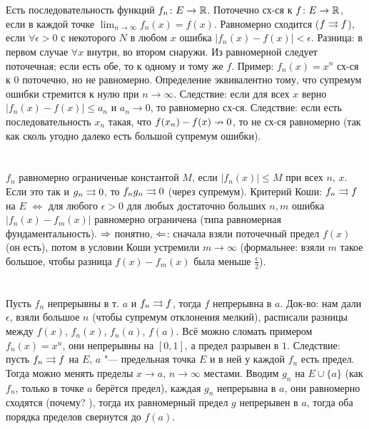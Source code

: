 \section{} %
Есть последовательность функций $f_n \colon E \to \mathbb{R}$.
Поточечно сх-ся к $f \colon E \to \mathbb{R}$, если в каждой точке $\lim_{n\to\infty} f_n(x) = f(x)$.
Равномерно сходится ($f \rightrightarrows f$), если $\forall \epsilon > 0$ с некоторого $N$
в любом $x$ ошибка $|f_n(x)-f(x)|<\epsilon$.
Разница: в первом случае $\forall x$ внутри, во втором снаружи.
Из равномерной следует поточечная; если есть обе, то к одному и тому же $f$.
Пример: $f_n(x)=x^n$ сх-ся к 0 поточечно, но не равномерно.
Определение эквивалентно тому, что супремум ошибки стремится к нулю при $n\to\infty$.
Следствие: если для всех $x$ верно $|f_n(x)-f(x)|\le a_n$ и $a_n \to 0$, то равномерно сх-ся.
Следствие: если есть последовательность $x_n$ такая, что $f(x_n) - f(x) \nrightarrow 0$, то не сх-ся равномерно
(так как сколь угодно далеко есть большой супремум ошибки).

\section{} %
$f_n$ равномерно ограниченые константой $M$, если $|f_n(x)| \le M$ при всех $n$, $x$.
Если это так и $g_n \rightrightarrows 0$, то $f_ng_n \rightrightarrows 0$ (через супремум).
Критерий Коши: $f_n \rightrightarrows f$ на $E$ $\iff$ для любого $\epsilon > 0$ для любых достаточно больших $n, m$
ошибка $|f_n(x) - f_m(x)|$ равномерно ограничена (типа равномерная фундаментальность).
$\Rightarrow$ понятно, $\Leftarrow$: сначала взяли поточечный предел $f(x)$ (он есть), потом в условии Коши устремили $m \to \infty$
(формальнее: взяли $m$ такое большое, чтобы разница $f(x)-f_m(x)$ была меньше $\frac{\epsilon}{2}$).

\section{} %
Пусть $f_n$ непрерывны в т. $a$ и $f_n \rightrightarrows f$, тогда $f$ непрерывна в $a$.
Док-во: нам дали $\epsilon$, взяли большое $n$ (чтобы супремум отклонения мелкий),
расписали разницы между $f(x)$, $f_n(x)$, $f_n(a)$, $f(a)$.
Всё можно сломать примером $f_n(x)=x^n$, они непрерывны на $[0,1]$, а предел разрывен в $1$.
Следствие: пусть $f_n \rightrightarrows f$ на $E$, $a$ "--- предельная точка $E$ и в ней у каждой $f_n$ есть предел.
Тогда можно менять пределы $x\to a$, $n \to \infty$ местами.
Вводим $g_n$ на $E \cup \{a\}$ (как $f_n$, только в точке $a$ берётся предел), каждая $g_n$ непрерывна в $a$,
они равномерно сходятся (почему? \TODO), тогда их равномерный предел $g$ непрерывен в $a$,
тогда оба порядка пределов свернутся до $f(a)$.

